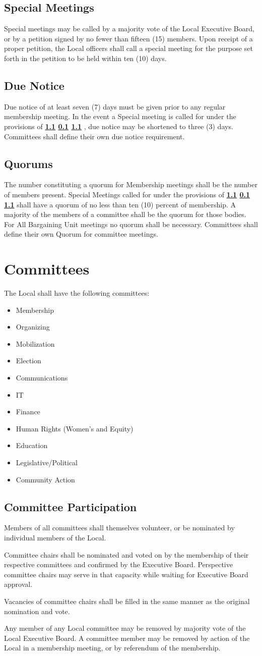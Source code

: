 \documentclass[11pt]{article}
\newcommand{\article}[1]{\vspace{.50cm}\section{#1}}
\newcommand{\articlesection}[1]{\vspace{.25cm}\subsection{#1}}
\newcommand{\fullref}[3]{%
  \textbf{%
    \ifthenelse{\isempty{#1}}%
    {}%
    {\ref{#1}}%
    \ifthenelse{\isempty{#2}}%
    {}%
    {%
      \ifthenelse{\isempty{#1}}{}{, }%
      \ref{#2}%
    }%
    \ifthenelse{\isempty{#3}}%
    {}%
    {\ref{#3}}%
  }%
}
\begin{document}
\articlesection{Special Meetings}\label{special-meetings}
Special meetings may be called by a majority vote of the Local Executive Board, or by a petition signed by no fewer than fifteen (15) members. Upon receipt of a proper petition, the Local officers shall call a special meeting for the purpose set forth in the petition to be held within ten (10) days.

\articlesection{Due Notice}
Due notice of at least seven (7) days must be given prior to any regular membership meeting. In the event a Special meeting is called for under the provisions of \fullref{}{special-meetings}{}, due notice may be shortened to three (3) days. Committees shall define their own due notice requirement.

\articlesection{Quorums}
The number constituting a quorum for Membership meetings shall be the number of members present. Special Meetings called for under the provisions of \fullref{}{special-meetings}{} shall have a quorum of no less than ten (10) percent of membership. A majority of the members of a committee shall be the quorum for those bodies. For All Bargaining Unit meetings no quorum shall be necessary. Committees shall define their own Quorum for committee meetings.

\article{Committees}\label{committees}
The Local shall have the following committees:
\begin{itemize}
\item Membership
\item Organizing
\item Mobilization
\item Election
\item Communications
\item IT
\item Finance
\item Human Rights (Women’s and Equity)
\item Education
\item Legislative/Political
\item Community Action
\end{itemize}

\articlesection{Committee Participation}
\begin{paralist}
\item Members of all committees shall themselves volunteer, or be nominated by individual members of the Local.
\item Committee chairs shall be nominated and voted on by the membership of their respective committees and confirmed by the Executive Board. Perspective committee chairs may serve in that capacity while waiting for Executive Board approval.
\item Vacancies of committee chairs shall be filled in the same manner as the original nomination and vote.
  \item Any member of any Local committee may be removed by majority vote of the Local Executive Board. A committee member may be removed by action of the Local in a membership meeting, or by referendum of the membership.
\end{paralist}
\end{document}
